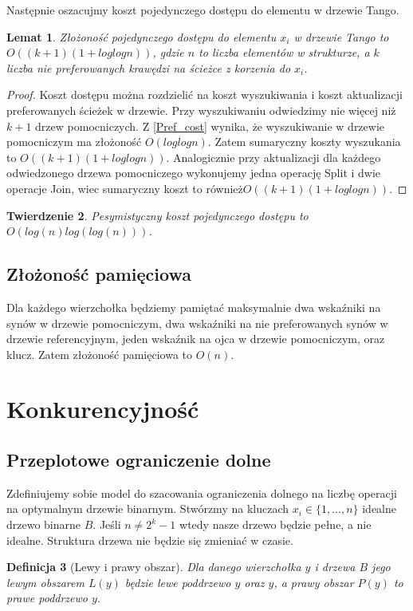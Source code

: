 \documentclass[declaration,shortabstract]{iithesis}
\newtheorem{definition}{Definicja}[chapter]
\theoremstyle{remark}
\theoremstyle{plain}
\newtheorem{theorem}[definition]{Twierdzenie}
\theoremstyle{plain}
\theoremstyle{plain}
\newtheorem{lemma}[definition]{Lemat}
\begin{document}
Następnie oszacujmy koszt pojedynczego dostępu do elementu w drzewie Tango. 
\begin{lemma}
\label{Tango_cost}
Złożoność pojedynczego dostępu do elementu \(x_i\) w drzewie Tango to \(O((k+1)(1+loglogn))\), gdzie $n$ to liczba elementów w strukturze, a $k$ liczba nie preferowanych krawędzi na ścieżce z korzenia do \(x_i\).
\end{lemma}
\begin{proof}
Koszt dostępu można rozdzielić na koszt wyszukiwania i koszt aktualizacji preferowanych ścieżek w drzewie. Przy wyszukiwaniu odwiedzimy nie więcej niż $k+1$ drzew pomocniczych. Z \ref{Pref_cost} wynika, że wyszukiwanie w drzewie pomocniczym ma złożoność \(O(loglogn)\). Zatem sumaryczny koszty wyszukania to \(O((k+1)(1+loglogn))\).
Analogicznie przy aktualizacji dla każdego odwiedzonego drzewa pomocniczego wykonujemy jedna operację Split i dwie operacje Join, wiec sumaryczny koszt to również\(O((k+1)(1+loglogn))\).
\end{proof}
\begin{theorem}
Pesymistyczny koszt pojedynczego dostępu to \(O(log(n)log(log(n)))\).
\end{theorem}
\subsection{Złożoność pamięciowa}
Dla każdego wierzchołka będziemy pamiętać maksymalnie dwa wskaźniki na synów w drzewie pomocniczym, dwa wskaźniki na nie preferowanych synów w drzewie referencyjnym, jeden wskaźnik na ojca w drzewie pomocniczym, oraz klucz. Zatem złożoność pamięciowa to \( O (n)\).
\section{Konkurencyjność}


\subsection{Przeplotowe ograniczenie dolne}
Zdefiniujemy sobie model do szacowania ograniczenia dolnego na liczbę operacji na optymalnym drzewie binarnym. Stwórzmy na kluczach $x_i \in \{1, ..., n\}$ idealne drzewo binarne \(B\). Jeśli \( n \neq 2^k -1\) wtedy nasze drzewo będzie pełne, a nie idealne. Struktura drzewa nie będzie się zmieniać w czasie.

\begin{definition}[Lewy i prawy obszar]
Dla danego wierzchołka \(y\) i drzewa \(B\) jego lewym obszarem \(L(y)\) będzie lewe poddrzewo \(y\) oraz \(y\), a prawy obszar \(P(y)\) to prawe poddrzewo \(y\).
\end{definition}
\end{document}
